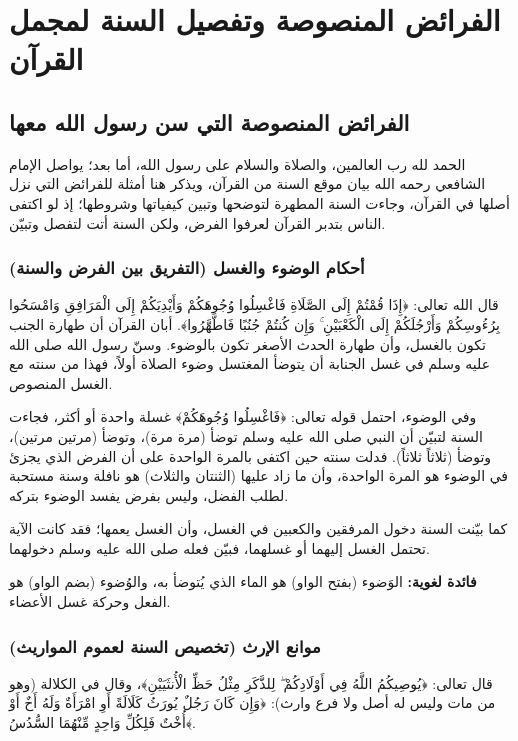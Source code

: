 \chapter{الفرائض المنصوصة وتفصيل السنة لمجمل القرآن}

\section{الفرائض المنصوصة التي سن رسول الله معها}
الحمد لله رب العالمين، والصلاة والسلام على رسول الله، أما بعد؛
يواصل الإمام الشافعي رحمه الله بيان موقع السنة من القرآن، ويذكر هنا أمثلة للفرائض التي نزل أصلها في القرآن، وجاءت السنة المطهرة لتوضحها وتبين كيفياتها وشروطها؛ إذ لو اكتفى الناس بتدبر القرآن لعرفوا الفرض، ولكن السنة أتت لتفصل وتبيّن.

\subsection{أحكام الوضوء والغسل (التفريق بين الفرض والسنة)}
قال الله تعالى: ﴿إِذَا قُمْتُمْ إِلَى الصَّلَاةِ فَاغْسِلُوا وُجُوهَكُمْ وَأَيْدِيَكُمْ إِلَى الْمَرَافِقِ وَامْسَحُوا بِرُءُوسِكُمْ وَأَرْجُلَكُمْ إِلَى الْكَعْبَيْنِ ۚ وَإِن كُنتُمْ جُنُبًا فَاطَّهَّرُوا﴾.
أبان القرآن أن طهارة الجنب تكون بالغسل، وأن طهارة الحدث الأصغر تكون بالوضوء. وسنّ رسول الله صلى الله عليه وسلم في غسل الجنابة أن يتوضأ المغتسل وضوء الصلاة أولاً، فهذا من سنته مع الغسل المنصوص.

وفي الوضوء، احتمل قوله تعالى: ﴿فَاغْسِلُوا وُجُوهَكُمْ﴾ غسلة واحدة أو أكثر، فجاءت السنة لتبيّن أن النبي صلى الله عليه وسلم توضأ (مرة مرة)، وتوضأ (مرتين مرتين)، وتوضأ (ثلاثاً ثلاثاً).
فدلت سنته حين اكتفى بالمرة الواحدة على أن الفرض الذي يجزئ في الوضوء هو المرة الواحدة، وأن ما زاد عليها (الثنتان والثلاث) هو نافلة وسنة مستحبة لطلب الفضل، وليس بفرض يفسد الوضوء بتركه.

كما بيّنت السنة دخول المرفقين والكعبين في الغسل، وأن الغسل يعمها؛ فقد كانت الآية تحتمل الغسل إليهما أو غسلهما، فبيّن فعله صلى الله عليه وسلم دخولهما.

\textbf{فائدة لغوية:} الوَضوء (بفتح الواو) هو الماء الذي يُتوضأ به، والوُضوء (بضم الواو) هو الفعل وحركة غسل الأعضاء.

\subsection{موانع الإرث (تخصيص السنة لعموم المواريث)}
قال تعالى: ﴿يُوصِيكُمُ اللَّهُ فِي أَوْلَادِكُمْ ۖ لِلذَّكَرِ مِثْلُ حَظِّ الْأُنثَيَيْنِ﴾، وقال في الكلالة (وهو من مات وليس له أصل ولا فرع وارث): ﴿وَإِن كَانَ رَجُلٌ يُورَثُ كَلَالَةً أَوِ امْرَأَةٌ وَلَهُ أَخٌ أَوْ أُخْتٌ فَلِكُلِّ وَاحِدٍ مِّنْهُمَا السُّدُسُ﴾.

